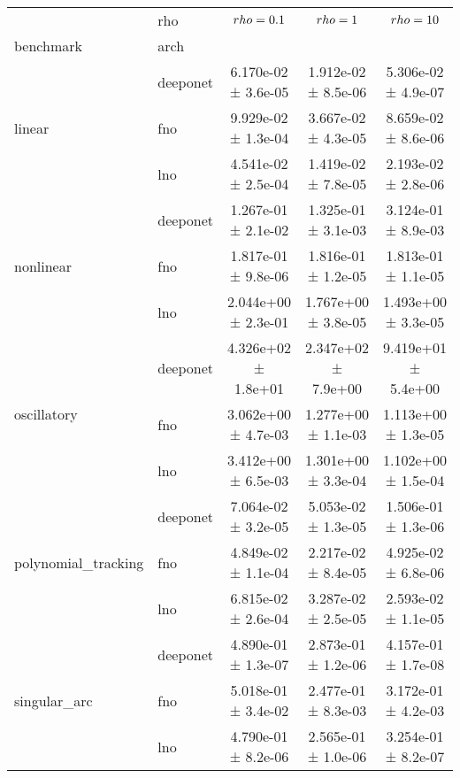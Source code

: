 \begin{tabular}{llccc}
\toprule
 & rho & $\\rho=0.1$ & $\\rho=1$ & $\\rho=10$ \\
benchmark & arch &  &  &  \\
\midrule
\multirow[t]{3}{*}{linear} & deeponet & 6.170e-02 ± 3.6e-05 & 1.912e-02 ± 8.5e-06 & 5.306e-02 ± 4.9e-07 \\
 & fno & 9.929e-02 ± 1.3e-04 & 3.667e-02 ± 4.3e-05 & 8.659e-02 ± 8.6e-06 \\
 & lno & 4.541e-02 ± 2.5e-04 & 1.419e-02 ± 7.8e-05 & 2.193e-02 ± 2.8e-06 \\
\cline{1-5}
\multirow[t]{3}{*}{nonlinear} & deeponet & 1.267e-01 ± 2.1e-02 & 1.325e-01 ± 3.1e-03 & 3.124e-01 ± 8.9e-03 \\
 & fno & 1.817e-01 ± 9.8e-06 & 1.816e-01 ± 1.2e-05 & 1.813e-01 ± 1.1e-05 \\
 & lno & 2.044e+00 ± 2.3e-01 & 1.767e+00 ± 3.8e-05 & 1.493e+00 ± 3.3e-05 \\
\cline{1-5}
\multirow[t]{3}{*}{oscillatory} & deeponet & 4.326e+02 ± 1.8e+01 & 2.347e+02 ± 7.9e+00 & 9.419e+01 ± 5.4e+00 \\
 & fno & 3.062e+00 ± 4.7e-03 & 1.277e+00 ± 1.1e-03 & 1.113e+00 ± 1.3e-05 \\
 & lno & 3.412e+00 ± 6.5e-03 & 1.301e+00 ± 3.3e-04 & 1.102e+00 ± 1.5e-04 \\
\cline{1-5}
\multirow[t]{3}{*}{polynomial_tracking} & deeponet & 7.064e-02 ± 3.2e-05 & 5.053e-02 ± 1.3e-05 & 1.506e-01 ± 1.3e-06 \\
 & fno & 4.849e-02 ± 1.1e-04 & 2.217e-02 ± 8.4e-05 & 4.925e-02 ± 6.8e-06 \\
 & lno & 6.815e-02 ± 2.6e-04 & 3.287e-02 ± 2.5e-05 & 2.593e-02 ± 1.1e-05 \\
\cline{1-5}
\multirow[t]{3}{*}{singular_arc} & deeponet & 4.890e-01 ± 1.3e-07 & 2.873e-01 ± 1.2e-06 & 4.157e-01 ± 1.7e-08 \\
 & fno & 5.018e-01 ± 3.4e-02 & 2.477e-01 ± 8.3e-03 & 3.172e-01 ± 4.2e-03 \\
 & lno & 4.790e-01 ± 8.2e-06 & 2.565e-01 ± 1.0e-06 & 3.254e-01 ± 8.2e-07 \\
\cline{1-5}
\bottomrule
\end{tabular}
